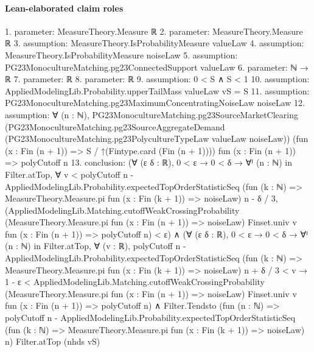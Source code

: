\documentclass[10pt]{article}
\begin{document}
\paragraph{Lean-elaborated claim roles}\begin{ReviewVerbatim}
1. parameter: MeasureTheory.Measure ℝ
2. parameter: MeasureTheory.Measure ℝ
3. assumption: MeasureTheory.IsProbabilityMeasure valueLaw
4. assumption: MeasureTheory.IsProbabilityMeasure noiseLaw
5. assumption: PG23MonocultureMatching.pg23ConnectedSupport valueLaw
6. parameter: ℕ → ℝ
7. parameter: ℝ
8. parameter: ℝ
9. assumption: 0 < S ∧ S < 1
10. assumption: AppliedModelingLib.Probability.upperTailMass valueLaw vS = S
11. assumption: PG23MonocultureMatching.pg23MaximumConcentratingNoiseLaw noiseLaw
12. assumption: ∀ (n : ℕ),
  PG23MonocultureMatching.pg23SourceMarketClearing
    (PG23MonocultureMatching.pg23SourceAggregateDemand
      (PG23MonocultureMatching.pg23PolycultureTypeLaw valueLaw noiseLaw))
    (fun (x : Fin (n + 1)) => S / ↑(Fintype.card (Fin (n + 1)))) fun (x : Fin (n + 1)) => polyCutoff n
13. conclusion: (∀ (ε δ : ℝ),
    0 < ε →
      0 < δ →
        ∀ᶠ (n : ℕ) in Filter.atTop,
          ∀
            v <
              polyCutoff n -
                  AppliedModelingLib.Probability.expectedTopOrderStatisticSeq
                    (fun (k : ℕ) => MeasureTheory.Measure.pi fun (x : Fin (k + 1)) => noiseLaw) n -
                δ / 3,
            (AppliedModelingLib.Matching.cutoffWeakCrossingProbability
                (MeasureTheory.Measure.pi fun (x : Fin (n + 1)) => noiseLaw) Finset.univ v fun (x : Fin (n + 1)) =>
                polyCutoff n) <
              ε) ∧
  (∀ (ε δ : ℝ),
      0 < ε →
        0 < δ →
          ∀ᶠ (n : ℕ) in Filter.atTop,
            ∀ (v : ℝ),
              polyCutoff n -
                      AppliedModelingLib.Probability.expectedTopOrderStatisticSeq
                        (fun (k : ℕ) => MeasureTheory.Measure.pi fun (x : Fin (k + 1)) => noiseLaw) n +
                    δ / 3 <
                  v →
                1 - ε <
                  AppliedModelingLib.Matching.cutoffWeakCrossingProbability
                    (MeasureTheory.Measure.pi fun (x : Fin (n + 1)) => noiseLaw) Finset.univ v fun (x : Fin (n + 1)) =>
                    polyCutoff n) ∧
    Filter.Tendsto
      (fun (n : ℕ) =>
        polyCutoff n -
          AppliedModelingLib.Probability.expectedTopOrderStatisticSeq
            (fun (k : ℕ) => MeasureTheory.Measure.pi fun (x : Fin (k + 1)) => noiseLaw) n)
      Filter.atTop (nhds vS)
\end{ReviewVerbatim}
\end{document}
